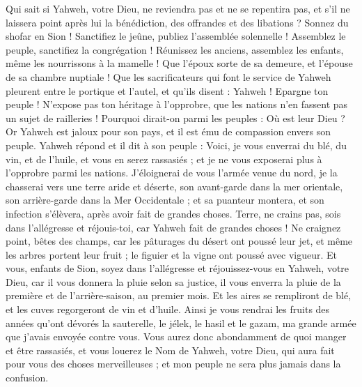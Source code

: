 \begin{multicols}{2}
Qui sait si Yahweh, votre Dieu, ne reviendra pas et ne se repentira pas, et s'il ne laissera point après lui la bénédiction, des offrandes et des libations ?
Sonnez du shofar en Sion ! Sanctifiez le jeûne, publiez l'assemblée solennelle !
Assemblez le peuple, sanctifiez la congrégation ! Réunissez les anciens, assemblez les enfants, même les nourrissons à la mamelle ! Que l'époux sorte de sa demeure, et l'épouse de sa chambre nuptiale !
Que les sacrificateurs qui font le service de Yahweh pleurent entre le portique et l'autel, et qu'ils disent : Yahweh ! Epargne ton peuple ! N'expose pas ton héritage à l'opprobre, que les nations n'en fassent pas un sujet de railleries ! Pourquoi dirait-on parmi les peuples : Où est leur Dieu ?
Or Yahweh est jaloux pour son pays, et il est ému de compassion envers son peuple.
Yahweh répond et il dit à son peuple : Voici, je vous enverrai du blé, du vin, et de l'huile, et vous en serez rassasiés ; et je ne vous exposerai plus à l'opprobre parmi les nations.
J'éloignerai de vous l'armée venue du nord, je la chasserai vers une terre aride et déserte, son avant-garde dans la mer orientale, son arrière-garde dans la Mer Occidentale ; et sa puanteur montera, et son infection s'élèvera, après avoir fait de grandes choses.
Terre, ne crains pas, sois dans l'allégresse et réjouis-toi, car Yahweh fait de grandes choses !
Ne craignez point, bêtes des champs, car les pâturages du désert ont poussé leur jet, et même les arbres portent leur fruit ; le figuier et la vigne ont poussé avec vigueur.
Et vous, enfants de Sion, soyez dans l'allégresse et réjouissez-vous en Yahweh, votre Dieu, car il vous donnera la pluie selon sa justice, il vous enverra la pluie de la première et de l'arrière-saison, au premier mois.
Et les aires se rempliront de blé, et les cuves regorgeront de vin et d'huile.
Ainsi je vous rendrai les fruits des années qu'ont dévorés la sauterelle, le jélek, le hasil et le gazam, ma grande armée que j'avais envoyée contre vous.
Vous aurez donc abondamment de quoi manger et être rassasiés, et vous louerez le Nom de Yahweh, votre Dieu, qui aura fait pour vous des choses merveilleuses ; et mon peuple ne sera plus jamais dans la confusion.

\end{multicols}

